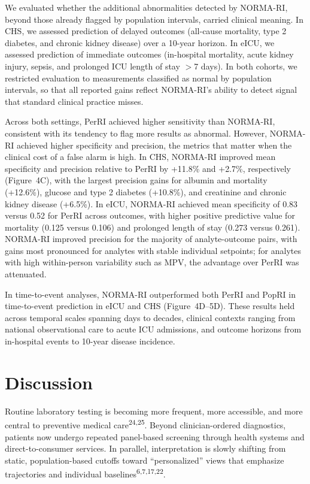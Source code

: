 \documentclass[11pt]{article}
\begin{document}
We evaluated whether the additional abnormalities detected by NORMA-RI, beyond those already flagged by population intervals, carried clinical meaning. In CHS, we assessed prediction of delayed outcomes (all-cause mortality, type 2 diabetes, and chronic kidney disease) over a 10-year horizon. In eICU, we assessed prediction of immediate outcomes (in-hospital mortality, acute kidney injury, sepsis, and prolonged ICU length of stay $>$7 days). In both cohorts, we restricted evaluation to measurements classified as normal by population intervals, so that all reported gains reflect NORMA-RI's ability to detect signal that standard clinical practice misses.

Across both settings, PerRI achieved higher sensitivity than NORMA-RI, consistent with its tendency to flag more results as abnormal. However, NORMA-RI achieved higher specificity and precision, the metrics that matter when the clinical cost of a false alarm is high. In CHS, NORMA-RI improved mean specificity and precision relative to PerRI by +11.8\% and +2.7\%, respectively (Figure~4C), with the largest precision gains for albumin and mortality (+12.6\%), glucose and type 2 diabetes (+10.8\%), and creatinine and chronic kidney disease (+6.5\%). In eICU, NORMA-RI achieved mean specificity of 0.83 versus 0.52 for PerRI across outcomes, with higher positive predictive value for mortality (0.125 versus 0.106) and prolonged length of stay (0.273 versus 0.261). NORMA-RI improved precision for the majority of analyte-outcome pairs, with gains most pronounced for analytes with stable individual setpoints; for analytes with high within-person variability such as MPV, the advantage over PerRI was attenuated.

In time-to-event analyses, NORMA-RI outperformed both PerRI and PopRI in time-to-event prediction in eICU and CHS (Figure~4D--5D). These results held across temporal scales spanning days to decades, clinical contexts ranging from national observational care to acute ICU admissions, and outcome horizons from in-hospital events to 10-year disease incidence.



\section*{Discussion}

Routine laboratory testing is becoming more frequent, more accessible, and more central to preventive medical care\textsuperscript{24,25}. Beyond clinician-ordered diagnostics, patients now undergo repeated panel-based screening through health systems and direct-to-consumer services. In parallel, interpretation is slowly shifting from static, population-based cutoffs toward ``personalized'' views that emphasize trajectories and individual baselines\textsuperscript{6,7,17,22}.
\end{document}
